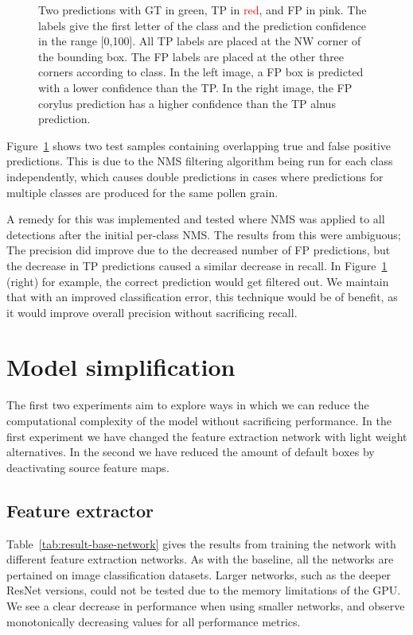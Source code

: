 \begin{figure}[htbp]
\begin{subfigure}[t]{0.4\textwidth}
  \end{subfigure}
  \caption[Predictions showing TP overlapped by FP from different class]{Two predictions with GT in \textcolor{nicegreen}{green}, TP in \textcolor{red}{red}, and FP in \textcolor{nicepink}{pink}.
The labels give the first letter of the class and the prediction confidence in the range [0,100].
All TP labels are placed at the NW corner of the bounding box.
The FP labels are placed at the other three corners according to class.
In the left image, a FP box is predicted with a lower confidence than the TP\@.
In the right image, the FP corylus prediction has a higher confidence than the TP alnus prediction.}\label{fig:results-overlapping-predictions}
\end{figure}

Figure~\ref{fig:results-overlapping-predictions} shows two test samples containing overlapping true and false positive predictions.
This is due to the NMS filtering algorithm being run for each class independently, which causes double predictions in cases where predictions for multiple classes are produced for the same pollen grain.

A remedy for this was implemented and tested where NMS was applied to all detections after the initial per-class NMS\@.
The results from this were ambiguous; The precision did improve due to the decreased number of FP predictions, but the decrease in TP predictions caused a similar decrease in recall.
In Figure~\ref{fig:results-overlapping-predictions} (right) for example, the correct prediction would get filtered out.
We maintain that with an improved classification error, this technique would be of benefit, as it would improve overall precision without sacrificing recall.

\section{Model simplification}\label{sec:results-simplification}
The first two experiments aim to explore ways in which we can reduce the computational complexity of the model without sacrificing performance.
In the first experiment we have changed the feature extraction network with light weight alternatives.
In the second we have reduced the amount of default boxes by deactivating source feature maps.

\subsection{Feature extractor}
Table~\ref{tab:result-base-network} gives the results from training the network with different feature extraction networks.
As with the baseline, all the networks are pertained on image classification datasets.
Larger networks, such as the deeper ResNet versions, could not be tested due to the memory limitations of the GPU\@.
We see a clear decrease in performance when using smaller networks, and observe monotonically decreasing values for all performance metrics.

